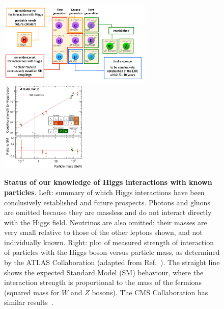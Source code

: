 \documentclass{article}
\begin{document}
\begin{figure}
  \phantom{x}\hspace{-0.5cm}
  \includegraphics[width=0.65\textwidth]{figs/Fig4a.pdf}%
  \includegraphics[width=0.36\textwidth]{figs/ATLASfig6-crop.pdf}    
  \caption{{\bf Status of our knowledge of Higgs interactions with
      known particles}. Left: summary of which Higgs interactions have
    been conclusively established and future prospects.  Photons and
    gluons are omitted because they are massless and do not interact
    directly with the Higgs field. Neutrinos are also omitted: their
    masses are very small relative to those of the other leptons
    shown, and not individually known.
    Right: plot of measured strength of
    interaction of particles with the Higgs boson versus particle
    mass, as determined by the ATLAS Collaboration (adapted from
    Ref.~\cite{ATLASNature}). 
    The straight line shows the expected Standard Model (SM) behaviour,
    where the interaction strength is proportional to the mass of
    the fermions (squared mass for $W$ and $Z$ bosons).
    The CMS Collaboration has similar results~\cite{CMSNature}.
  } 
  \label{fig:interactions}
\end{figure}
\end{document}
